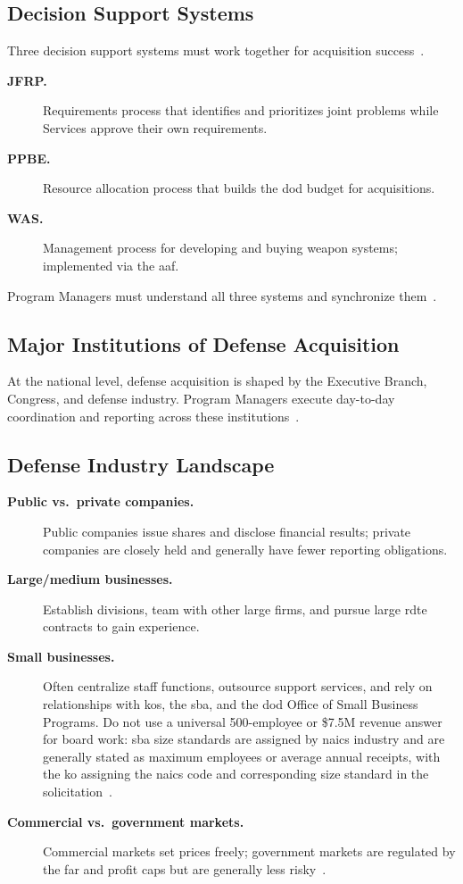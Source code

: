 \documentclass[../main.tex]{subfiles}
\begin{document}
\subsection{Decision Support Systems}
Three decision support systems must work together for acquisition success~\autocite{edo-3-3-1-acq-policy-players-2025}.
\begin{description}
  \item[\textbf{JFRP.}] Requirements process that identifies and prioritizes joint problems while Services approve their own requirements.
  \item[\textbf{PPBE.}] Resource allocation process that builds the \ac{dod} budget for acquisitions.
  \item[\textbf{WAS.}] Management process for developing and buying weapon systems; implemented via the \ac{aaf}.
\end{description}
Program Managers must understand all three systems and synchronize them~\autocite{edo-3-3-1-acq-policy-players-2025}.

\subsection{Major Institutions of Defense Acquisition}
At the national level, defense acquisition is shaped by the Executive Branch, Congress, and defense industry. Program Managers execute day-to-day coordination and reporting across these institutions~\autocite{edo-3-3-1-acq-policy-players-2025}.

\subsection{Defense Industry Landscape}
\begin{description}
  \item[\textbf{Public vs.\ private companies.}] Public companies issue shares and disclose financial results; private companies are closely held and generally have fewer reporting obligations.
  \item[\textbf{Large/medium businesses.}] Establish divisions, team with other large firms, and pursue large \ac{rdte} contracts to gain experience.
  \item[\textbf{Small businesses.}] Often centralize staff functions, outsource support services, and rely on relationships with \acp{ko}, the \ac{sba}, and the \ac{dod} Office of Small Business Programs. Do not use a universal 500-employee or \$7.5M revenue answer for board work: \ac{sba} size standards are assigned by \ac{naics} industry and are generally stated as maximum employees or average annual receipts, with the \ac{ko} assigning the \ac{naics} code and corresponding size standard in the solicitation~\autocite{SBA-Size-Standards-2026,FAR-19-102-Size-Standards}.
  \item[\textbf{Commercial vs.\ government markets.}] Commercial markets set prices freely; government markets are regulated by the \ac{far} and profit caps but are generally less risky~\autocite{edo-3-3-1-acq-policy-players-2025}.
\end{description}
\end{document}

